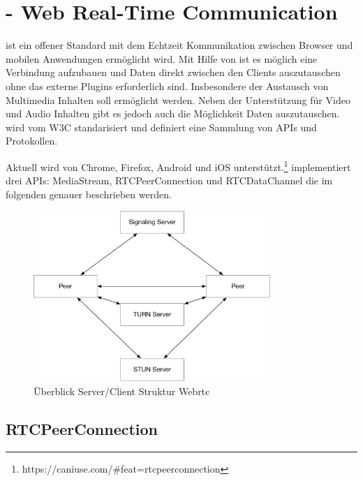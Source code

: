 \section{\webrtc - Web Real-Time Communication}

\webrtc ist ein offener Standard mit dem Echtzeit Kommunikation zwischen Browser und mobilen Anwendungen ermöglicht wird. Mit Hilfe von \webrtc ist es möglich eine \pTp Verbindung aufzubauen und Daten direkt zwischen den Clients auszutauschen ohne das externe Plugins erforderlich sind. Insbesondere der Austausch von Multimedia Inhalten soll ermöglicht werden. Neben der Unterstützung für Video und Audio Inhalten gibt es jedoch auch die Möglichkeit Daten auszutauschen. \webrtc wird vom W3C\cite{w3Webrtc} standarisiert und definiert eine Sammlung von APIs und Protokollen. 


Aktuell wird \webrtc von Chrome, Firefox, Android und iOS unterstützt.\footnote{https://caniuse.com/\#feat=rtcpeerconnection} \webrtc implementiert drei APIs: MediaStream, RTCPeerConnection und RTCDataChannel die im folgenden genauer beschrieben werden.

\begin{figure}[!h]
	\centering
	\includegraphics[width=0.8\textwidth]{figures/Webrtc_overview}
	\caption[A Figure Short-Title]{Überblick Server/Client Struktur Webrtc}
	\label{fig:webrtc_overview}
\end{figure}





\subsection{RTCPeerConnection}

